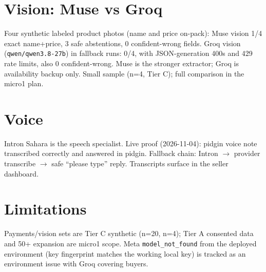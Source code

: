 \documentclass[11pt]{article}
\begin{document}
\section{Vision: Muse vs Groq}
Four synthetic labeled product photos (name and price on-pack):
Muse vision 1/4 exact name+price, 3 safe abstentions, 0 confident-wrong
fields. Groq vision (\texttt{qwen/qwen3.8-27b}) in fallback runs: 0/4,
with JSON-generation 400s and 429 rate limits, also 0 confident-wrong.
Muse is the stronger extractor; Groq is availability backup only.
Small sample (n=4, Tier C); full comparison in the micro1 plan.

\section{Voice}
Intron Sahara is the speech specialist. Live proof (2026-11-04): pidgin
voice note transcribed correctly and answered in pidgin. Fallback chain:
Intron $\rightarrow$ provider transcribe $\rightarrow$ safe ``please
type'' reply. Transcripts surface in the seller dashboard.

\section{Limitations}
Payments/vision sets are Tier C synthetic (n=20, n=4); Tier A consented
data and 50+ expansion are micro1 scope. Meta \texttt{model\_not\_found}
from the deployed environment (key fingerprint matches the working local
key) is tracked as an environment issue with Groq covering buyers.
\end{document}
